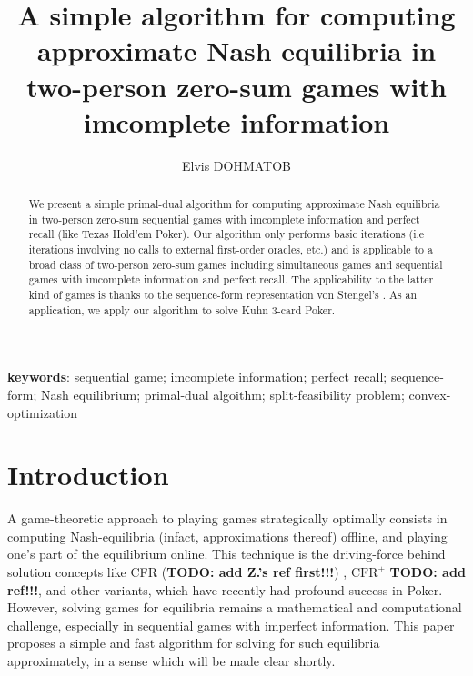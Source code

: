 \documentclass[envcountsame]{llncs} %
\title{\bf A simple algorithm for computing approximate Nash equilibria in
  two-person zero-sum games with imcomplete information}
\author{Elvis DOHMATOB\\\email{elvis.dohmatob@inria.fr}}
\institute{
Parietal team, Inria Saclay Ile-de-France, Saclay, France
}
\begin{document}
\maketitle

\begin{abstract}
We present a simple primal-dual algorithm
for computing approximate Nash equilibria in two-person zero-sum
sequential games with imcomplete information and perfect recall (like
Texas Hold'em Poker).
Our algorithm only performs basic iterations
(i.e iterations involving no
calls to external first-order oracles, etc.) and is applicable to a
broad class of two-person zero-sum
games including simultaneous games and sequential games with
imcomplete information and perfect recall. The applicability to the
latter kind of games is thanks to the sequence-form representation von
Stengel's \cite{von1996efficient}.
As an application, we apply our algorithm to solve Kuhn 3-card Poker.
\end{abstract}

\textbf{keywords}: sequential game; imcomplete information; perfect
recall; sequence-form; Nash equilibrium; primal-dual algoithm;
split-feasibility problem; convex-optimization

\section{Introduction}
\label{sec:intro}
A game-theoretic approach to playing games strategically optimally
consists in computing Nash-equilibria (infact, approximations thereof)
offline, and playing one's part of the equilibrium online. This
technique is the driving-force behind solution concepts like CFR
(\textbf{TODO: add Z.'s ref first!!!}) \cite{lanctot2009monte},
$\text{CFR}^{+}$ \textbf{TODO: add ref!!!}, and other variants, which
have recently had profound success in Poker. However, solving games
for equilibria remains a mathematical and computational challenge,
especially in sequential games with imperfect information. This paper
proposes a simple and fast algorithm for solving for such equilibria
approximately, in a sense which will be made clear shortly.
\end{document}
